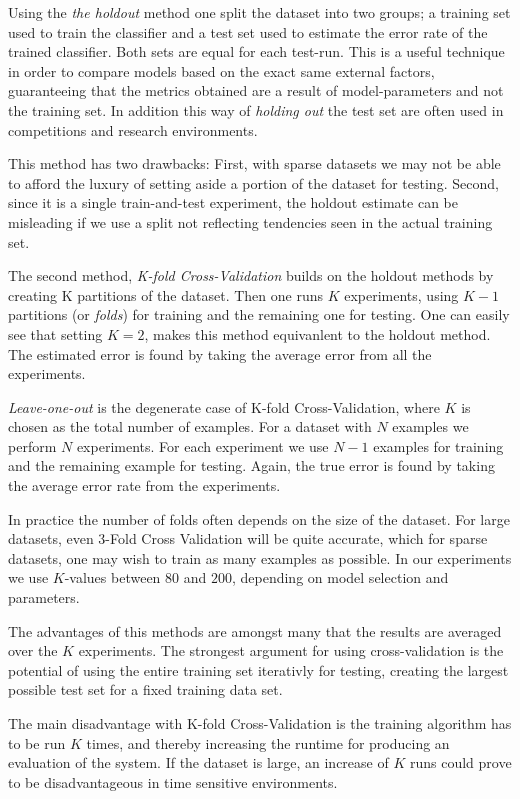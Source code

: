Using the \textit{the holdout} method one split the dataset into two groups; a
training set used to train the classifier and a test set used to estimate the
error rate of the trained classifier. Both sets are equal for each test-run.
This is a useful technique in order to compare models based on the exact same
external factors, guaranteeing that the metrics obtained are a result of
model-parameters and not the training set. In addition this way of
\textit{holding out} the test set are often used in competitions and research
environments.

This method has two drawbacks: First, with sparse datasets we may not be able
to afford the luxury of setting aside a portion of the dataset for testing.
Second, since it is a single train-and-test experiment, the holdout estimate
can be misleading if we use a split not reflecting tendencies seen in the
actual training set.

The second method, \textit{K-fold Cross-Validation} builds on the holdout
methods by creating K partitions of the dataset. Then one runs $K$ experiments,
using $K-1$ partitions (or \textit{folds}) for training and the remaining one
for testing. One can easily see that setting $K=2$, makes this method
equivanlent to the holdout method. The estimated error is found by taking the
average error from all the experiments.

\textit{Leave-one-out} is the degenerate case of K-fold Cross-Validation, where
$K$ is chosen as the total number of examples. For a dataset with $N$ examples
we perform $N$ experiments. For each experiment we use $N-1$ examples for
training and the remaining example for testing. Again, the true error is found
by taking the average error rate from the experiments.

In practice the number of folds often depends on the size of the dataset. For
large datasets, even 3-Fold Cross Validation will be quite accurate, which for
sparse datasets, one may wish to train as many examples as possible. In our
experiments we use $K$-values between $80$ and $200$, depending on model
selection and parameters.

The advantages of this methods are amongst many that the results are averaged
over the $K$ experiments. The strongest argument for using cross-validation is
the potential of using the entire training set iterativly for testing, creating
the largest possible test set for a fixed training data set.

The main disadvantage with K-fold Cross-Validation is the training algorithm
has to be run $K$ times, and thereby increasing the runtime for producing an
evaluation of the system. If the dataset is large, an increase of $K$ runs
could prove to be disadvantageous in time sensitive environments.

